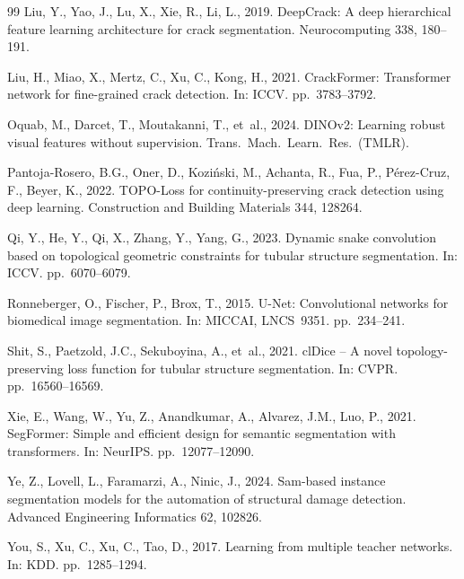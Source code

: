 \documentclass[review,authoryear]{elsarticle}
\begin{document}
\begin{thebibliography}{99}
Liu, Y., Yao, J., Lu, X., Xie, R., Li, L., 2019.
\newblock DeepCrack: A deep hierarchical feature learning architecture for crack segmentation.
\newblock Neurocomputing 338, 180--191.

Liu, H., Miao, X., Mertz, C., Xu, C., Kong, H., 2021.
\newblock CrackFormer: Transformer network for fine-grained crack detection.
\newblock In: ICCV. pp.~3783--3792.

Oquab, M., Darcet, T., Moutakanni, T., et~al., 2024.
\newblock DINOv2: Learning robust visual features without supervision.
\newblock Trans.\ Mach.\ Learn.\ Res.\ (TMLR).

Pantoja-Rosero, B.G., Oner, D., Kozi\'{n}ski, M., Achanta, R., Fua, P., P\'{e}rez-Cruz, F., Beyer, K., 2022.
\newblock TOPO-Loss for continuity-preserving crack detection using deep learning.
\newblock Construction and Building Materials 344, 128264.

Qi, Y., He, Y., Qi, X., Zhang, Y., Yang, G., 2023.
\newblock Dynamic snake convolution based on topological geometric constraints for tubular structure segmentation.
\newblock In: ICCV. pp.~6070--6079.

Ronneberger, O., Fischer, P., Brox, T., 2015.
\newblock U-Net: Convolutional networks for biomedical image segmentation.
\newblock In: MICCAI, LNCS~9351. pp.~234--241.

Shit, S., Paetzold, J.C., Sekuboyina, A., et~al., 2021.
\newblock clDice -- A novel topology-preserving loss function for tubular structure segmentation.
\newblock In: CVPR. pp.~16560--16569.

Xie, E., Wang, W., Yu, Z., Anandkumar, A., Alvarez, J.M., Luo, P., 2021.
\newblock SegFormer: Simple and efficient design for semantic segmentation with transformers.
\newblock In: NeurIPS. pp.~12077--12090.

Ye, Z., Lovell, L., Faramarzi, A., Ninic, J., 2024.
\newblock Sam-based instance segmentation models for the automation of structural damage detection.
\newblock Advanced Engineering Informatics 62, 102826.

You, S., Xu, C., Xu, C., Tao, D., 2017.
\newblock Learning from multiple teacher networks.
\newblock In: KDD. pp.~1285--1294.


\end{thebibliography}
\end{document}

